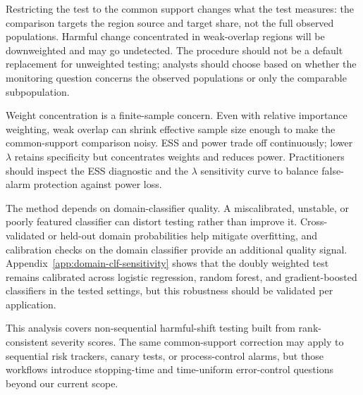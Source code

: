 Restricting the test to the common support changes what the test measures: the comparison targets the region source and target share, not the full observed populations. Harmful change concentrated in weak-overlap regions will be downweighted and may go undetected. The procedure should not be a default replacement for unweighted testing; analysts should choose based on whether the monitoring question concerns the observed populations or only the comparable subpopulation.

Weight concentration is a finite-sample concern. Even with relative importance weighting, weak overlap can shrink effective sample size enough to make the common-support comparison noisy. ESS and power trade off continuously; lower $\lambda$ retains specificity but concentrates weights and reduces power. Practitioners should inspect the ESS diagnostic and the $\lambda$ sensitivity curve to balance false-alarm protection against power loss.

The method depends on domain-classifier quality. A miscalibrated, unstable, or poorly featured classifier can distort testing rather than improve it. Cross-validated or held-out domain probabilities help mitigate overfitting, and calibration checks on the domain classifier provide an additional quality signal. Appendix~\ref{app:domain-clf-sensitivity} shows that the doubly weighted test remains calibrated across logistic regression, random forest, and gradient-boosted classifiers in the tested settings, but this robustness should be validated per application.

This analysis covers non-sequential harmful-shift testing built from rank-consistent severity scores. The same common-support correction may apply to sequential risk trackers, canary tests, or process-control alarms, but those workflows introduce stopping-time and time-uniform error-control questions beyond our current scope.
